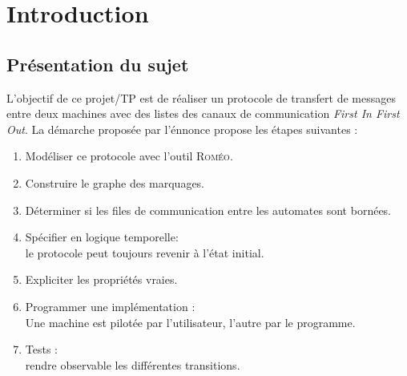 \chapter{Introduction}\label{chap:Intro}
\section{Présentation du sujet}
L'objectif de ce projet/TP est de réaliser un protocole de transfert de messages entre deux machines avec des listes des canaux de communication \textit{First In First Out}. La démarche proposée par l'énnonce propose les  étapes  suivantes :
  
  
  \begin{enumerate}
  \item 
    Modéliser ce protocole avec l'outil \textsc{Roméo}.
  \item
    Construire le graphe des marquages.
  \item
    Déterminer si les files de communication entre les automates sont bornées.
  \item
    Spécifier en logique temporelle: \hfill \\
    le protocole peut toujours revenir à l’état initial.
  \item 
    Expliciter les propriétés vraies.
  \item
    Programmer une implémentation : \hfill \\
    Une machine est pilotée par l'utilisateur, l'autre par le programme.
  \item
    Tests  :\hfill \\
    rendre observable les différentes transitions.
  \end{enumerate}

